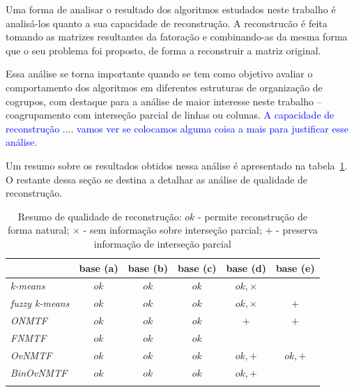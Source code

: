 \documentclass[
    12pt,                %
    oneside,            %
    a4paper,            %
    english,            %
    brazil                %
    ]{abntex2ppgsi}
\begin{document}
Uma forma de analisar o resultado dos algoritmos estudados neste trabalho é analisá-los quanto a sua capacidade de reconstrução.
A reconstrucão é feita tomando as matrizes resultantes da fatoração e combinando-as da mesma forma que o seu problema foi proposto, de forma a reconstruir a matriz original.

Essa análise se torna importante quando se tem como objetivo avaliar o comportamento dos algoritmos em diferentes estruturas de organização de cogrupos, com destaque para a análise de maior interesse neste trabalho -- coagrupamento com interseção parcial de linhas ou colunas.
\textcolor{blue}{A capacidade de reconstrução .... vamos ver se colocamos alguma coisa a mais para justificar esse análise.}

Um resumo sobre os resultados obtidos nessa análise é apresentado na tabela~\ref{tab:resumoREC}.
O restante dessa seção se destina a detalhar as análise de qualidade de reconstrução.

\begin{table}[htpb]
\centering
    \caption{Resumo de qualidade de reconstrução: $ok$ - permite reconstrução de forma natural; $\times$ - sem informação sobre interseção parcial; $+$ - preserva informação de interseção parcial}
        \begin{tabular}{lccccc}
            \hline
            & \textbf{base (a)} & \textbf{base (b)} & \textbf{base (c)} & \textbf{base (d)}& \textbf{base (e)} \\
            \hline
            \textit{k-means}       & $ok$ & $ok$ & $ok$ & $ok, \times$ &     \\
            \textit{fuzzy k-means} & $ok$ & $ok$ & $ok$ & $ok, \times$ & $+$ \\
            \textit{ONMTF}         & $ok$ & $ok$ & $ok$ & $+$          & $+$ \\
            \textit{FNMTF}         & $ok$ & $ok$ & $ok$ &              &     \\
            \textit{OvNMTF}        & $ok$ & $ok$ & $ok$ & $ok, +$      & $ok, +$ \\
            \textit{BinOvNMTF}     & $ok$ & $ok$ & $ok$ & $ok, +       $ &   \\
            \hline
             & & & & &  \\
        \end{tabular}
    \label{tab:resumoREC}
\end{table}
\end{document}
